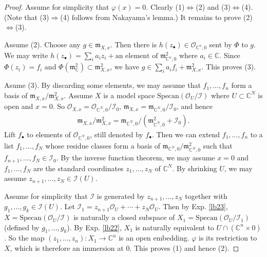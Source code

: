 \documentclass[12pt,b5paper,notitlepage]{report}
\theoremstyle{definition}
\theoremstyle{plain}
\newcommand{\fk}{\mathfrak}
\newcommand{\mc}{\mathcal}
\newcommand{\scr}{\mathscr}
\newcommand{\blt}{\bullet}
\newcommand{\Cbb}{\mathbb C}
\newcommand{\Specan}{\mathrm{Specan}}
\numberwithin{equation}{section}
\begin{document}
\begin{proof}
Assume for simplicity that $\varphi(x)=0$. Clearly (1)$\Leftrightarrow$(2) and (3)$\Leftrightarrow$(4). (Note that (3)$\Rightarrow$(4) follows from Nakayama's lemma.) It remains to prove (2)$\Leftrightarrow$(3). 

Assume (2). Choose any $g\in\fk m_{X,x}$. Then there is $h(z_\blt)\in\scr O_{\Cbb^n,0}$ sent by $\Phi$ to $g$. We may write $h(z_\blt)=\sum_i a_iz_i+\text{an element of }\fk m_{\Cbb^n,0}^2$ where $a_i\in\Cbb$. Since $\Phi(z_i)=f_i$ and $\Phi(\fk m_{\Cbb}^2)\subset\fk m_{X,x}^2$, we have $g\in \sum_i a_i f_i+\fk m_{X,x}^2$. This proves (3).

Asume (3). By discarding some elements, we may assume that $f_1,\dots,f_n$ form a basis of $\fk m_{X,x}/\fk m_{X,x}^2$. Assume $X$ is a model space $\Specan(\scr O_U/\mc I)$ where $U\subset\Cbb^N$ is open and $x=0$. So $\scr O_{X,x}=\scr O_{\Cbb^N,0}/\mc I_0$, $\fk m_{X,x}=\fk m_{\Cbb^N,0}/\mc I_0$, and hence
\begin{align}
\fk m_{X,x}/\fk m_{X,x}^2=\fk m_{\Cbb^N,0}/(\fk m_{\Cbb^N,0}^2+\mc I_0).\label{eq60}
\end{align}
Lift $f_\blt$ to elements of $\scr O_{\Cbb^N,0}$, still denoted by $f_\blt$. Then we can extend $f_1,\dots,f_n$ to a list $f_1,\dots,f_N$ whose residue classes form a basis of $\fk m_{\Cbb^N,0}/\fk m_{\Cbb^N,0}^2$ such that $f_{n+1},\dots,f_N\in\mc I_0$. By the inverse function theorem, we may assume $x=0$ and $f_1,\dots,f_N$ are the standard coordinates $z_1,\dots,z_N$ of $\Cbb^N$. By shrinking $U$, we may assume $z_{n+1},\dots,z_N\in\mc I(U)$.

Assume for simplicity that $\mc I$ is generated by $z_{n+1},\dots,z_N$ together with $g_1,\dots,g_k\in\mc I(U)$. Let $\mc I_1=z_{n+1}\scr O_U+\cdots+z_N\scr O_U$. Then by Exp. \ref{lb23}, $X=\Specan(\scr O_U/\mc I)$ is naturally a closed subspace of $X_1=\Specan(\scr O_U/\mc I_1)$ (defined by $g_1,\dots,g_k$). By Exp. \ref{lb22}, $X_1$ is naturally equivalent to $U\cap(\Cbb^n\times 0)$. So the map $(z_1,\dots,z_n):X_1\rightarrow \Cbb^n$ is an open embedding. $\varphi$ is its restriction to $X$, which is therefore an immersion at $0$. This proves (1) and hence (2).
\end{proof}
\end{document}
